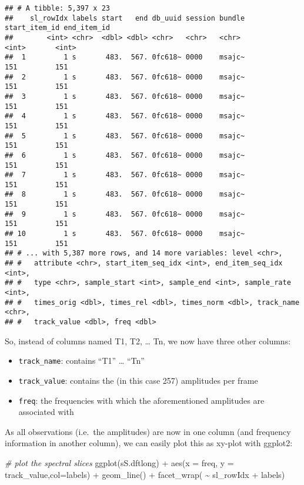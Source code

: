 \documentclass[
]{book}
\newenvironment{Shaded}{\begin{snugshade}}{\end{snugshade}}
\newcommand{\AttributeTok}[1]{\textcolor[rgb]{0.77,0.63,0.00}{#1}}
\newcommand{\CommentTok}[1]{\textcolor[rgb]{0.56,0.35,0.01}{\textit{#1}}}
\newcommand{\FunctionTok}[1]{\textcolor[rgb]{0.00,0.00,0.00}{#1}}
\newcommand{\NormalTok}[1]{#1}
\newcommand{\SpecialCharTok}[1]{\textcolor[rgb]{0.00,0.00,0.00}{#1}}
\providecommand{\tightlist}{%
  \setlength{\itemsep}{0pt}\setlength{\parskip}{0pt}}
\begin{document}
\begin{verbatim}
## # A tibble: 5,397 x 23
##    sl_rowIdx labels start   end db_uuid session bundle start_item_id end_item_id
##        <int> <chr>  <dbl> <dbl> <chr>   <chr>   <chr>          <int>       <int>
##  1         1 s       483.  567. 0fc618~ 0000    msajc~           151         151
##  2         1 s       483.  567. 0fc618~ 0000    msajc~           151         151
##  3         1 s       483.  567. 0fc618~ 0000    msajc~           151         151
##  4         1 s       483.  567. 0fc618~ 0000    msajc~           151         151
##  5         1 s       483.  567. 0fc618~ 0000    msajc~           151         151
##  6         1 s       483.  567. 0fc618~ 0000    msajc~           151         151
##  7         1 s       483.  567. 0fc618~ 0000    msajc~           151         151
##  8         1 s       483.  567. 0fc618~ 0000    msajc~           151         151
##  9         1 s       483.  567. 0fc618~ 0000    msajc~           151         151
## 10         1 s       483.  567. 0fc618~ 0000    msajc~           151         151
## # ... with 5,387 more rows, and 14 more variables: level <chr>,
## #   attribute <chr>, start_item_seq_idx <int>, end_item_seq_idx <int>,
## #   type <chr>, sample_start <int>, sample_end <int>, sample_rate <int>,
## #   times_orig <dbl>, times_rel <dbl>, times_norm <dbl>, track_name <chr>,
## #   track_value <dbl>, freq <dbl>
\end{verbatim}

So, instead of columns named T1, T2, \ldots{} Tn, we now have three other columns:

\begin{itemize}
\tightlist
\item
  \texttt{track\_name}: contains ``T1'' \ldots{} ``Tn''
\item
  \texttt{track\_value}: contains the (in this case 257) amplitudes per frame
\item
  \texttt{freq}: the frequencies with which the aforementioned amplitudes are associated with
\end{itemize}

As all observations (i.e.~the amplitudes) are now in one column (and frequency information in another column), we can easily plot this as xy-plot with ggplot2:

\begin{Shaded}
\begin{Highlighting}[]
\CommentTok{\# plot the spectral slices}
\FunctionTok{ggplot}\NormalTok{(sS.dftlong) }\SpecialCharTok{+}
  \FunctionTok{aes}\NormalTok{(}\AttributeTok{x =}\NormalTok{ freq, }\AttributeTok{y =}\NormalTok{ track\_value,}\AttributeTok{col=}\NormalTok{labels) }\SpecialCharTok{+}
  \FunctionTok{geom\_line}\NormalTok{() }\SpecialCharTok{+}
  \FunctionTok{facet\_wrap}\NormalTok{( }\SpecialCharTok{\textasciitilde{}}\NormalTok{ sl\_rowIdx }\SpecialCharTok{+}\NormalTok{ labels)}
\end{Highlighting}
\end{Shaded}
\end{document}
